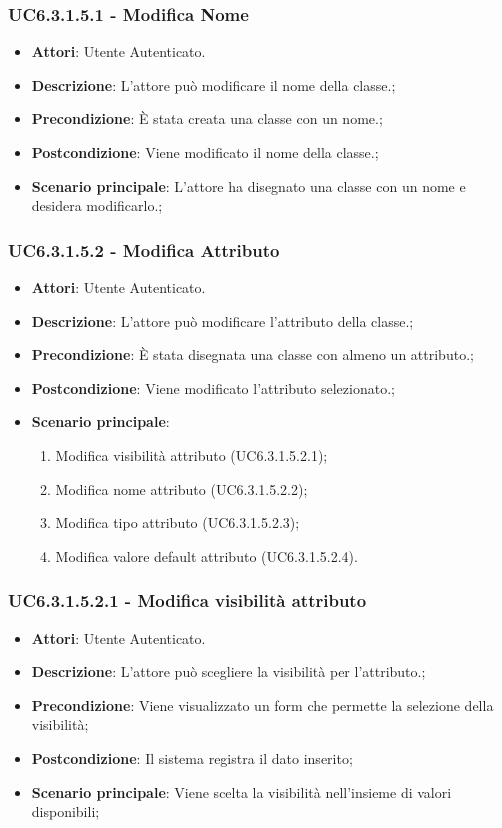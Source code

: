 \subsubsection{UC6.3.1.5.1 - Modifica Nome} 
\label{sssec:UC6.3.1.5.1} 
\begin{itemize} 
\item \textbf{Attori}: Utente Autenticato.
\item \textbf{Descrizione}: L'attore può modificare il nome della classe.;
\item \textbf{Precondizione}: È stata creata una classe con un nome.;
\item \textbf{Postcondizione}: Viene modificato il nome della classe.;
\item \textbf{Scenario principale}: L'attore ha disegnato una classe con un nome e desidera modificarlo.;\end{itemize} 
\subsubsection{UC6.3.1.5.2 - Modifica Attributo} 
\label{sssec:UC6.3.1.5.2} 
\begin{itemize} 
\item \textbf{Attori}: Utente Autenticato.
\item \textbf{Descrizione}: L'attore può modificare l'attributo della classe.;
\item \textbf{Precondizione}: È stata disegnata una classe con almeno un attributo.;
\item \textbf{Postcondizione}: Viene modificato l'attributo selezionato.;
\item \textbf{Scenario principale}: \begin{enumerate}\item Modifica visibilità attributo (UC6.3.1.5.2.1);\item Modifica nome attributo (UC6.3.1.5.2.2);\item Modifica tipo attributo (UC6.3.1.5.2.3);\item Modifica valore default attributo (UC6.3.1.5.2.4). 
 \end{enumerate}
\end{itemize} 
\subsubsection{UC6.3.1.5.2.1 - Modifica visibilità attributo} 
\label{sssec:UC6.3.1.5.2.1} 
\begin{itemize} 
\item \textbf{Attori}: Utente Autenticato.
\item \textbf{Descrizione}: L'attore può scegliere la visibilità per l'attributo.;
\item \textbf{Precondizione}: Viene visualizzato un form che permette la selezione della visibilità;
\item \textbf{Postcondizione}: Il sistema registra il dato inserito;
\item \textbf{Scenario principale}: Viene scelta la visibilità nell'insieme di valori disponibili;\end{itemize} 

